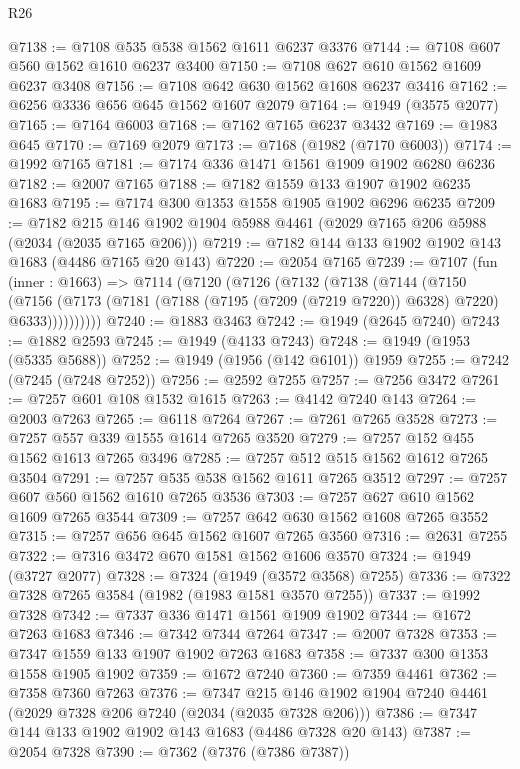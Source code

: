 \begin{lexlean}{R26}
\begin{coremodule}
@7138 := @7108 @535 @538 @1562 @1611 @6237 @3376
@7144 := @7108 @607 @560 @1562 @1610 @6237 @3400
@7150 := @7108 @627 @610 @1562 @1609 @6237 @3408
@7156 := @7108 @642 @630 @1562 @1608 @6237 @3416
@7162 := @6256 @3336 @656 @645 @1562 @1607 @2079
@7164 := @1949 (@3575 @2077)
@7165 := @7164 @6003
@7168 := @7162 @7165 @6237 @3432
@7169 := @1983 @645
@7170 := @7169 @2079
@7173 := @7168 (@1982 (@7170 @6003))
@7174 := @1992 @7165
@7181 := @7174 @336 @1471 @1561 @1909 @1902 @6280 @6236
@7182 := @2007 @7165
@7188 := @7182 @1559 @133 @1907 @1902 @6235 @1683
@7195 := @7174 @300 @1353 @1558 @1905 @1902 @6296 @6235
@7209 := @7182 @215 @146 @1902 @1904 @5988 @4461 (@2029 @7165 @206 @5988 (@2034 (@2035 @7165 @206)))
@7219 := @7182 @144 @133 @1902 @1902 @143 @1683 (@4486 @7165 @20 @143)
@7220 := @2054 @7165
@7239 := @7107
    (fun (inner : @1663) =>
    @7114
      (@7120
        (@7126
          (@7132
            (@7138
              (@7144
                (@7150
                  (@7156
                    (@7173 (@7181 (@7188 (@7195 (@7209 (@7219 @7220)) @6328) @7220) @6333))))))))))
@7240 := @1883 @3463
@7242 := @1949 (@2645 @7240)
@7243 := @1882 @2593
@7245 := @1949 (@4133 @7243)
@7248 := @1949 (@1953 (@5335 @5688))
@7252 := @1949 (@1956 (@142 @6101)) @1959
@7255 := @7242 (@7245 (@7248 @7252))
@7256 := @2592 @7255
@7257 := @7256 @3472
@7261 := @7257 @601 @108 @1532 @1615
@7263 := @4142 @7240 @143
@7264 := @2003 @7263
@7265 := @6118 @7264
@7267 := @7261 @7265 @3528
@7273 := @7257 @557 @339 @1555 @1614 @7265 @3520
@7279 := @7257 @152 @455 @1562 @1613 @7265 @3496
@7285 := @7257 @512 @515 @1562 @1612 @7265 @3504
@7291 := @7257 @535 @538 @1562 @1611 @7265 @3512
@7297 := @7257 @607 @560 @1562 @1610 @7265 @3536
@7303 := @7257 @627 @610 @1562 @1609 @7265 @3544
@7309 := @7257 @642 @630 @1562 @1608 @7265 @3552
@7315 := @7257 @656 @645 @1562 @1607 @7265 @3560
@7316 := @2631 @7255
@7322 := @7316 @3472 @670 @1581 @1562 @1606 @3570
@7324 := @1949 (@3727 @2077)
@7328 := @7324 (@1949 (@3572 @3568) @7255)
@7336 := @7322 @7328 @7265 @3584 (@1982 (@1983 @1581 @3570 @7255))
@7337 := @1992 @7328
@7342 := @7337 @336 @1471 @1561 @1909 @1902
@7344 := @1672 @7263 @1683
@7346 := @7342 @7344 @7264
@7347 := @2007 @7328
@7353 := @7347 @1559 @133 @1907 @1902 @7263 @1683
@7358 := @7337 @300 @1353 @1558 @1905 @1902
@7359 := @1672 @7240
@7360 := @7359 @4461
@7362 := @7358 @7360 @7263
@7376 := @7347 @215 @146 @1902 @1904 @7240 @4461 (@2029 @7328 @206 @7240 (@2034 (@2035 @7328 @206)))
@7386 := @7347 @144 @133 @1902 @1902 @143 @1683 (@4486 @7328 @20 @143)
@7387 := @2054 @7328
@7390 := @7362 (@7376 (@7386 @7387))

\end{coremodule}
\end{lexlean}
